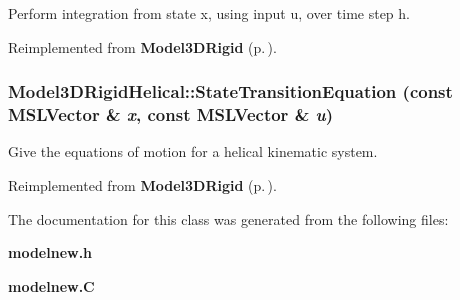 Perform integration from state x, using input u, over time step h.



Reimplemented from {\bf Model3DRigid} {\rm (p.\,\pageref{classModel3DRigid_a2})}.
\subsubsection{ Model3DRigid\-Helical::State\-Transition\-Equation (const {\bf MSLVector} \& {\em x}, const {\bf MSLVector} \& {\em u})\hspace{0.3cm}{\tt  [virtual]}}\label{classModel3DRigidHelical_a2}


Give the equations of motion for a helical kinematic system.



Reimplemented from {\bf Model3DRigid} {\rm (p.\,\pageref{classModel3DRigid_a3})}.

The documentation for this class was generated from the following files:\begin{CompactItemize}
\item 
{\bf modelnew.h}\item 
{\bf modelnew.C}\end{CompactItemize}
